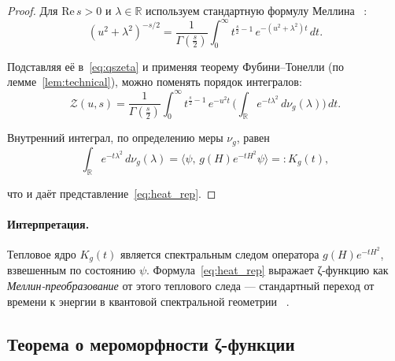 \documentclass{article}
\numberwithin{equation}{section}
\theoremstyle{plain}
\theoremstyle{definition}
\theoremstyle{remark}
\def\infty{∞}\def\partial{∂}\def\sum{Σ}\def\int{∫}%
\begin{document}
\begin{proof}
Для $\mathrm{Re}\,s>0$ и $\lambda\in\mathbb R$ используем стандартную формулу Меллина ~\cite{MinakshisundaramPleijel1949}:
\begin{equation}
(u^2+\lambda^2)^{-s/2}
=\frac{1}{\Gamma(\frac s2)}
\int_0^\infty t^{\frac s2-1}\,e^{-(u^2+\lambda^2)t}\,dt.
\label{eq:QSSC0023}
\end{equation}

Подставляя её в~\eqref{eq:qszeta} и применяя теорему Фубини–Тонелли (по лемме~\ref{lem:technical}), можно поменять порядок интегралов:
\begin{equation}
\mathcal Z(u,s)
=\frac{1}{\Gamma(\frac s2)}
\int_0^\infty t^{\frac s2 -1}\,e^{-u^2t}\,
\Big(\int_{\mathbb R} e^{-t\lambda^2}\,d\nu_g(\lambda)\Big)\,dt.
\label{eq:QSSC0024}
\end{equation}

Внутренний интеграл, по определению меры $\nu_g$, равен
\begin{equation}
\int_{\mathbb R} e^{-t\lambda^2}\,d\nu_g(\lambda)
=\langle \psi,\,g(H)e^{-tH^2}\psi\rangle
=:K_g(t),
\label{eq:QSSC0025}
\end{equation}

что и даёт представление~\eqref{eq:heat_rep}.
\end{proof}

\paragraph{Интерпретация.}  
Тепловое ядро $K_g(t)$ является спектральным следом оператора $g(H)e^{-tH^2}$, взвешенным по состоянию $\psi$.  
Формула~\eqref{eq:heat_rep} выражает ζ-функцию как \emph{Меллин-преобразование} от этого теплового следа — стандартный переход от времени к энергии в квантовой спектральной геометрии ~\cite{Kirsten2001}.

\subsection{Теорема о мероморфности ζ-функции}
\label{subsec:meromorphic}
\end{document}
